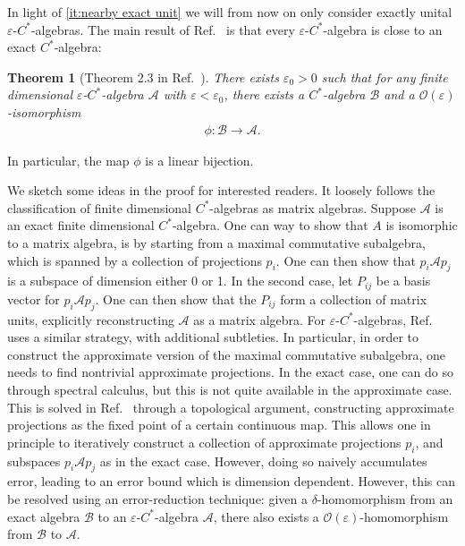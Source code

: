 \documentclass[11pt,reqno]{amsart}
\newtheorem{theorem}{Theorem}[section]
\theoremstyle{definition}
\theoremstyle{remark}
\numberwithin{equation}{section}
\newcommand{\eps}{\varepsilon}
\newcommand{\cA}{\mathcal A}
\newcommand{\cB}{\mathcal B}
\newcommand{\bigO}{\mathcal O}
\begin{document}
In light of \cref{it:nearby exact unit} we will from now on only consider exactly unital $\eps$-$C^*$-algebras.
The main result of Ref.~\cite{kitaev2024almost} is that every $\eps$-$C^*$-algebra is close to an exact $C^*$-algebra:

\begin{theorem}[Theorem 2.3 in Ref.~\cite{kitaev2024almost}] \label{thm:algebras-kitaev}
    There exists $\eps_0 >0$ such that for any finite dimensional $\eps$-$C^*$-algebra $\cA$ with $\eps < \eps_0$, there exists a $C^*$-algebra $\cB$ and a $\bigO(\eps)$-isomorphism
    \begin{align*}
        \phi : \cB \to \cA.
    \end{align*}
\end{theorem}
\noindent
In particular, the map $\phi$ is a linear bijection.

We sketch some ideas in the proof for interested readers.
It loosely follows the classification of finite dimensional $C^*$-algebras as matrix algebras.
Suppose $\cA$ is an exact finite dimensional $C^*$-algebra.
One can way to show that $A$ is isomorphic to a matrix algebra, is by starting from a maximal commutative subalgebra, which is spanned by a collection of projections $p_i$.
One can then show that $p_i \cA p_j$ is a subspace of dimension either 0 or 1. In the second case, let $P_{ij}$ be a basis vector for $p_i \cA p_j$.
One can then show that the $P_{ij}$ form a collection of matrix units, explicitly reconstructing $\cA$ as a matrix algebra.
For $\eps$-$C^*$-algebras, Ref.~\cite{kitaev2024almost} uses a similar strategy, with additional subtleties.
In particular, in order to construct the approximate version of the maximal commutative subalgebra, one needs to find nontrivial approximate projections.
In the exact case, one can do so through spectral calculus, but this is not quite available in the approximate case.
This is solved in Ref.~\cite{kitaev2024almost} through a topological argument, constructing approximate projections as the fixed point of a certain continuous map.
This allows one in principle to iteratively construct a collection of approximate projections $p_i$, and subspaces $p_i \cA p_j$ as in the exact case.
However, doing so naively accumulates error, leading to an error bound which is dimension dependent.
However, this can be resolved using an error-reduction technique: given a $\delta$-homomorphism from an exact algebra $\cB$ to an $\eps$-$C^*$-algebra $\cA$, there also exists a $\bigO(\eps)$-homomorphism from $\cB$ to $\cA$.
\end{document}

